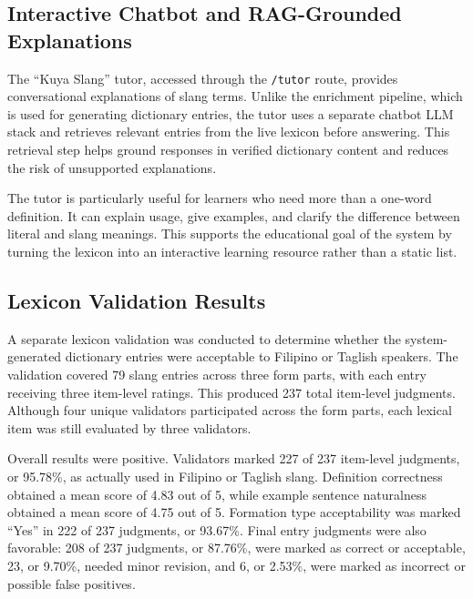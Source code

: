 \subsection{Interactive Chatbot and RAG-Grounded Explanations}

The ``Kuya Slang'' tutor, accessed through the \texttt{/tutor} route, provides conversational explanations of slang terms. Unlike the enrichment pipeline, which is used for generating dictionary entries, the tutor uses a separate chatbot LLM stack and retrieves relevant entries from the live lexicon before answering. This retrieval step helps ground responses in verified dictionary content and reduces the risk of unsupported explanations.

The tutor is particularly useful for learners who need more than a one-word definition. It can explain usage, give examples, and clarify the difference between literal and slang meanings. This supports the educational goal of the system by turning the lexicon into an interactive learning resource rather than a static list.

\subsection{Lexicon Validation Results}

A separate lexicon validation was conducted to determine whether the system-generated dictionary entries were acceptable to Filipino or Taglish speakers. The validation covered 79 slang entries across three form parts, with each entry receiving three item-level ratings. This produced 237 total item-level judgments. Although four unique validators participated across the form parts, each lexical item was still evaluated by three validators.

Overall results were positive. Validators marked 227 of 237 item-level judgments, or 95.78\%, as actually used in Filipino or Taglish slang. Definition correctness obtained a mean score of 4.83 out of 5, while example sentence naturalness obtained a mean score of 4.75 out of 5. Formation type acceptability was marked ``Yes'' in 222 of 237 judgments, or 93.67\%. Final entry judgments were also favorable: 208 of 237 judgments, or 87.76\%, were marked as correct or acceptable, 23, or 9.70\%, needed minor revision, and 6, or 2.53\%, were marked as incorrect or possible false positives.


